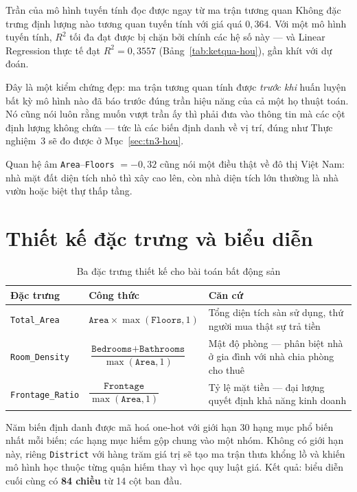 \begin{phathien}{Trần của mô hình tuyến tính đọc được ngay từ ma trận tương quan}
Không đặc trưng định lượng nào tương quan tuyến tính với giá quá $0{,}364$.
Với một mô hình tuyến tính, $R^2$ tối đa đạt được bị chặn bởi chính các hệ số
này --- và Linear Regression thực tế đạt $R^2 = 0{,}3557$
(Bảng~\ref{tab:ketqua-hou}), gần khít với dự đoán.

Đây là một kiểm chứng đẹp: ma trận tương quan tính được \emph{trước khi} huấn
luyện bất kỳ mô hình nào đã báo trước đúng trần hiệu năng của cả một họ thuật
toán. Nó cũng nói luôn rằng muốn vượt trần ấy thì phải đưa vào thông tin mà các
cột định lượng không chứa --- tức là các biến định danh về vị trí, đúng như Thực
nghiệm~3 sẽ đo được ở Mục~\ref{sec:tn3-hou}.

Quan hệ âm \texttt{Area}--\texttt{Floors} $=-0{,}32$ cũng nói một điều thật về
đô thị Việt Nam: nhà mặt đất diện tích nhỏ thì xây cao lên, còn nhà diện tích
lớn thường là nhà vườn hoặc biệt thự thấp tầng.
\end{phathien}

\section{Thiết kế đặc trưng và biểu diễn}
\label{sec:bieudien-hou}

\begin{table}[H]
\centering
\caption{Ba đặc trưng thiết kế cho bài toán bất động sản}
\label{tab:engineered-hou}
\small
\begin{tabularx}{\textwidth}{@{}L{2.9cm}L{4.4cm}X@{}}
\toprule
\textbf{Đặc trưng} & \textbf{Công thức} & \textbf{Căn cứ} \\
\midrule
\texttt{Total\_Area}     & $\texttt{Area}\times\max(\texttt{Floors},1)$ & Tổng diện tích sàn sử dụng, thứ người mua thật sự trả tiền \\
\addlinespace
\texttt{Room\_Density}   & $\dfrac{\texttt{Bedrooms}+\texttt{Bathrooms}}{\max(\texttt{Area},1)}$ & Mật độ phòng --- phân biệt nhà ở gia đình với nhà chia phòng cho thuê \\
\addlinespace
\texttt{Frontage\_Ratio} & $\dfrac{\texttt{Frontage}}{\max(\texttt{Area},1)}$ & Tỷ lệ mặt tiền --- đại lượng quyết định khả năng kinh doanh \\
\bottomrule
\end{tabularx}
\end{table}

Năm biến định danh được mã hoá one-hot với giới hạn 30 hạng mục phổ biến nhất
mỗi biến; các hạng mục hiếm gộp chung vào một nhóm. Không có giới hạn này,
riêng \texttt{District} với hàng trăm giá trị sẽ tạo ma trận thưa khổng lồ và
khiến mô hình học thuộc từng quận hiếm thay vì học quy luật giá. Kết quả:
biểu diễn cuối cùng có \textbf{84 chiều} từ 14 cột ban đầu.

